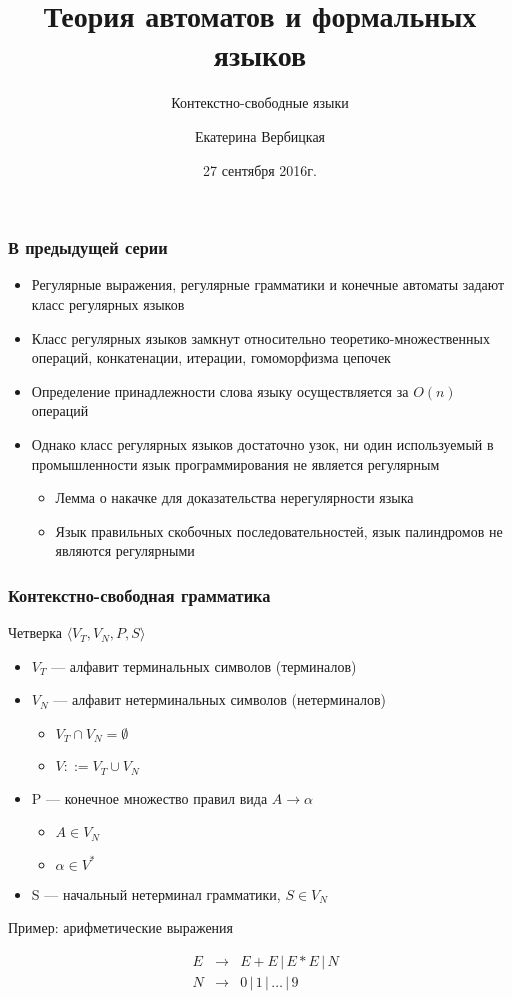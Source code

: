 \documentclass{beamer}
\title[]{Теория автоматов и формальных языков}
\subtitle[]{Контекстно-свободные языки}
\institute[]{
Санкт-Петербургский государственный электротехнический университет <<ЛЭТИ>>\\
}
\author[]{Екатерина Вербицкая}
\date{27 сентября 2016г.}
\begin{document}
{
  \begin{frame}
    \titlepage
  \end{frame}
}


\begin{frame}[fragile]
  \transwipe[direction=90]
  \frametitle{В предыдущей серии}
  \begin{itemize}
    \item Регулярные выражения, регулярные грамматики и конечные автоматы задают класс регулярных языков
    \item Класс регулярных языков замкнут относительно теоретико-множественных операций, конкатенации, итерации, гомоморфизма цепочек
    \item Определение принадлежности слова языку осуществляется за $O(n)$ операций
    \item Однако класс регулярных языков достаточно узок, ни один используемый в промышленности язык программирования не является регулярным
    \begin{itemize}
      \item Лемма о накачке для доказательства нерегулярности языка
      \item Язык правильных скобочных последовательностей, язык палиндромов не являются регулярными
    \end{itemize}
  \end{itemize}
\end{frame}

\begin{frame}[fragile]
  \transwipe[direction=90]
  \frametitle{Контекстно-свободная грамматика}
  Четверка $\langle V_T, V_N, P, S \rangle$

   \begin{itemize}
     \item $V_T$ --- алфавит терминальных символов (терминалов) 
     \item $V_N$ --- алфавит нетерминальных символов (нетерминалов)
     \begin{itemize} 
        \item $V_T \cap V_N = \emptyset$ 
        \item $V ::= V_T \cup V_N$
     \end{itemize}
     \item P --- конечное множество правил вида $A \rightarrow \alpha$
     \begin{itemize}
       \item $A \in V_N $
       \item $\alpha \in V^*$
     \end{itemize}  
     \item S --- начальный нетерминал грамматики, $S  \in V_N$
  \end{itemize}

Пример: арифметические выражения

  $$
  \begin{array}{crcl}
  &E& \rightarrow & E + E \, | \, E * E \, | \, N \\
  &N& \rightarrow & 0 \, | \, 1  \, | \, \dots \, | \, 9
  \end{array}
  $$
\end{frame}
\end{document}
